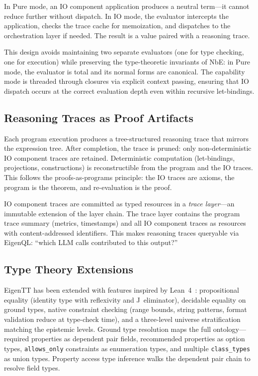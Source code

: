\documentclass[10pt,twocolumn,letterpaper]{article}
\newcommand{\code}[1]{\texttt{\small #1}}
\begin{document}
In Pure mode, an IO component application produces a neutral term---it cannot reduce further without dispatch.
In IO mode, the evaluator intercepts the application, checks the trace cache for memoization, and dispatches to the orchestration layer if needed.
The result is a value paired with a reasoning trace.

This design avoids maintaining two separate evaluators (one for type checking, one for execution) while preserving the type-theoretic invariants of NbE: in Pure mode, the evaluator is total and its normal forms are canonical.
The capability mode is threaded through closures via explicit context passing, ensuring that IO dispatch occurs at the correct evaluation depth even within recursive let-bindings.

\subsection{Reasoning Traces as Proof Artifacts}

Each program execution produces a tree-structured reasoning trace that mirrors the expression tree.
After completion, the trace is pruned: only non-deterministic IO component traces are retained.
Deterministic computation (let-bindings, projections, constructions) is reconstructible from the program and the IO traces.
This follows the proofs-as-programs principle: the IO traces are axioms, the program is the theorem, and re-evaluation is the proof.

IO component traces are committed as typed resources in a \emph{trace layer}---an immutable extension of the layer chain.
The trace layer contains the program trace summary (metrics, timestamps) and all IO component traces as resources with content-addressed identifiers.
This makes reasoning traces queryable via EigenQL: ``which LLM calls contributed to this output?''

\subsection{Type Theory Extensions}

EigenTT has been extended with features inspired by Lean~4~\cite{lean4}:
propositional equality (identity type with reflexivity and J~eliminator),
decidable equality on ground types,
native constraint checking (range bounds, string patterns, format validation reduce at type-check time),
and a three-level universe stratification matching the epistemic levels.
Ground type resolution maps the full ontology---required properties as dependent pair fields, recommended properties as option types, \code{allows\_only} constraints as enumeration types, and multiple \code{class\_types} as union types.
Property access type inference walks the dependent pair chain to resolve field types.
\end{document}
